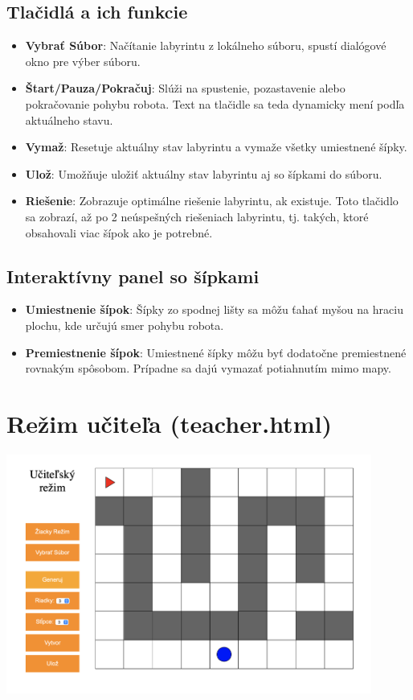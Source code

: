 \documentclass{article}
\begin{document}
\subsection*{Tlačidlá a ich funkcie}
\begin{itemize}
    \item \textbf{Vybrať Súbor}: Načítanie labyrintu z lokálneho súboru, spustí dialógové okno pre výber súboru.
    \item \textbf{Štart/Pauza/Pokračuj}: Slúži na spustenie, pozastavenie alebo pokračovanie pohybu robota. 
    Text na tlačidle sa teda dynamicky mení podľa aktuálneho stavu.
    \item \textbf{Vymaž}: Resetuje aktuálny stav labyrintu a vymaže všetky umiestnené šípky.
    \item \textbf{Ulož}: Umožňuje uložiť aktuálny stav labyrintu aj so šípkami do súboru.
    \item \textbf{Riešenie}: Zobrazuje optimálne riešenie labyrintu, ak existuje. 
    Toto tlačidlo sa zobrazí, až po 2 neúspešných riešeniach labyrintu, tj. takých, ktoré obsahovali viac šípok ako je potrebné.
\end{itemize}

\subsection*{Interaktívny panel so šípkami}
\begin{itemize}
    \item \textbf{Umiestnenie šípok}: Šípky zo spodnej lišty sa môžu ťahať myšou na hraciu plochu, kde určujú smer pohybu robota.
    \item \textbf{Premiestnenie šípok}: Umiestnené šípky môžu byť dodatočne premiestnené rovnakým spôsobom. 
    Prípadne sa dajú vymazať potiahnutím mimo mapy. 
\end{itemize}

\section*{Režim učiteľa (teacher.html)}

\begin{center}
    \includegraphics[width=12cm]{teacher.png}
\end{center}
\end{document}
